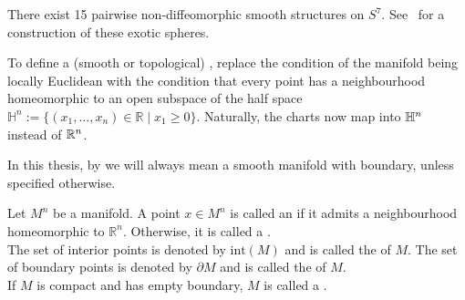 \documentclass[a4paper,11pt]{article}
\begin{document}

\begin{example}
    There exist 15 pairwise non-diffeomorphic smooth structures on \(S^7\). See\ \cite{kervaire} for a construction of these exotic spheres.
\end{example}

\begin{definition}
    To define a (smooth or topological) , replace the condition of the manifold being locally Euclidean with the condition that every point has a neighbourhood homeomorphic to an open subspace of the half space \(\mathbb{H}^n:=\{(x_1,\dots,x_n)\in\mathbb{R}\mid x_1\geq0\}\). Naturally, the charts now map into \(\mathbb{H}^n\) instead of \(\mathbb{R}^n\).
\end{definition}

\begin{comment}
\begin{definition}[Manifold]
    A \demph{smooth manifold with boundary} \(M=(M,[\mathcal{A}])\) is the data of a topological space \(M\) and an equivalence class \([\mathcal{A}]\) of smooth atlases such that:
    \begin{itemize}
        \item \(M\) is Hausdorff,
        \item \(M\) is second countable,
        \item \(\mathcal{A}\) is locally finite.
    \end{itemize}
\end{definition}
\end{comment}

\begin{remark}
    In this thesis, by  we will always mean a smooth manifold with boundary, unless specified otherwise.
\end{remark}

\begin{definition}
    Let \(M^n\) be a manifold. A point \(x\in M^n\) is called an  if it admits a neighbourhood homeomorphic to \(\mathbb{R}^n\). Otherwise, it is called a .\\
    The set of interior points is denoted by \(\mathrm{int}(M)\) and is called the  of \(M\). The set of boundary points is denoted by \(\partial M\) and is called the  of \(M\).\\
    If \(M\) is compact and has empty boundary, \(M\) is called a . %
\end{definition}
\end{document}
